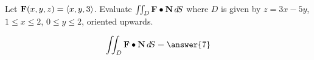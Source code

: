 \documentclass{ximera}
\author{David Guichard \and Neal Koblitz \and H. Jerome Keisler \and Albert Scheller \and Barry Balof \and Mike Wills \and Matthew Carr}
\begin{document}
\begin{exercise}




Let $\mathbf{F}(x,y,z)=\left\langle x,y,3\right\rangle$. Evaluate $\iint_{D}\mathbf{F}\bullet\mathbf{N}\mathop{}\!d\! S$ where $D$ is given by $z=3x-5y$, $1\le x\le 2$, $0\le y\le 2$, oriented upwards.

\begin{prompt}
\[
\iint_{D}\vec{F}\dotp\vec{N}\d S=\answer{7}
\]
\end{prompt}


\end{exercise}
\end{document}
